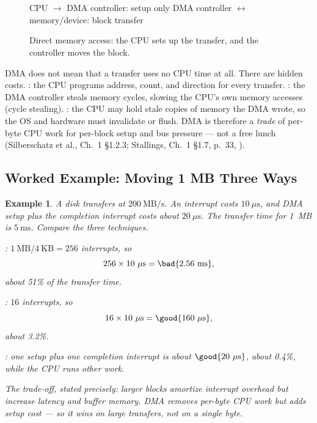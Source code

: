 \documentclass[11pt]{article}
\newtheorem{example}{Example}
\begin{document}
\begin{figure}[ht]
\centering
\small
{}\hfill
{}\hfill
{}\\[0.3em]
\\[0.3em]
{\footnotesize CPU $\to$ DMA controller: setup only \quad DMA controller $\leftrightarrow$ memory/device: block transfer}
\caption{Direct memory access: the CPU sets up the transfer, and the controller moves the block.}
\label{fig:dma}
\end{figure}

DMA does not mean that a transfer uses no CPU time at all. There are hidden costs. : the CPU programs address, count, and direction for every transfer. : the DMA controller steals memory cycles, slowing the CPU's own memory accesses (cycle stealing). : the CPU may hold stale copies of memory the DMA wrote, so the OS and hardware must invalidate or flush. DMA is therefore a \emph{trade} of per-byte CPU work for per-block setup and bus pressure --- not a free lunch (Silberschatz et al., Ch.~1 \S1.2.3; Stallings, Ch.~1 \S1.7, p.~33, \cite{StallingsOS_internals_design_principles}).

\subsection{Worked Example: Moving 1 MB Three Ways}

\begin{example}
A disk transfers at $200\ \text{MB/s}$. An interrupt costs $10\ \mu\text{s}$, and DMA setup plus the completion interrupt costs about $20\ \mu\text{s}$. The transfer time for 1~MB is $5\ \text{ms}$. Compare the three techniques.

: $1\ \text{MB} / 4\ \text{KB} = 256$ interrupts, so
\[
256 \times 10\ \mu\text{s} = \bad{2.56\ \text{ms}},
\]
about 51\% of the transfer time.

: $16$ interrupts, so
\[
16 \times 10\ \mu\text{s} = \good{160\ \mu\text{s}},
\]
about 3.2\%.

: one setup plus one completion interrupt is about $\good{20\ \mu\text{s}}$, about 0.4\%, while the CPU runs other work.

The trade-off, stated precisely: larger blocks amortize interrupt overhead but increase latency and buffer memory. DMA removes per-byte CPU work but adds setup cost --- so it wins on large transfers, not on a single byte.
\end{example}
\end{document}
